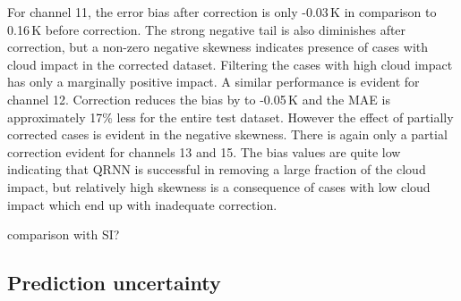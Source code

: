 \documentclass[amt, manuscript]{copernicus}
\newcommand{\todo}[1]{{\color{red} #1}}
\begin{document}
For channel 11, the error bias after correction is only -0.03\,K in comparison to 0.16\,K before correction. The strong negative tail is also diminishes after correction, but a non-zero negative skewness indicates presence of cases with cloud impact in the corrected dataset. Filtering the cases with high cloud impact has only a marginally positive impact. A similar performance is evident for channel 12. Correction reduces the bias by to -0.05\,K and the MAE is approximately 17\% less for the entire test dataset. However the effect of partially corrected cases is evident in the negative skewness. There is again only a partial correction evident for channels 13 and 15. The bias values are quite low indicating that QRNN is successful in removing a large fraction of the cloud impact, but relatively high skewness is a consequence of cases with low cloud impact which end up with inadequate correction.  
 
\todo{comparison with SI?}


\subsection{Prediction uncertainty}
\end{document}
